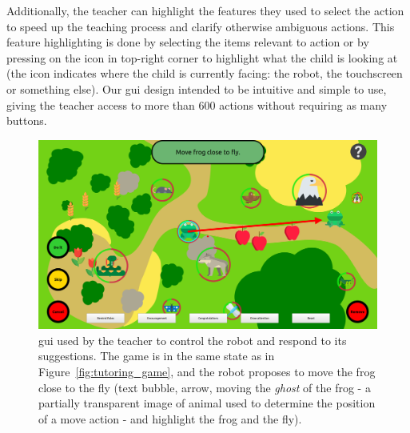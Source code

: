 Additionally, the teacher can highlight the features they used to select the action to speed up the teaching process and clarify otherwise ambiguous actions. This feature highlighting is done by selecting the items relevant to action or by pressing on the icon in top-right corner to highlight what the child is looking at (the icon indicates where the child is currently facing: the robot, the touchscreen or something else).
Our \gls{gui} design intended to be intuitive and simple to use, giving the teacher access to more than 600 actions without requiring as many buttons. %

\begin{figure}[ht]
	\centering
	\includegraphics[width=1\textwidth]{gui.png}
	\caption{\gls{gui} used by the teacher to control the robot and respond to its suggestions. The game is in the same state as in Figure~\ref{fig:tutoring_game}, and the robot proposes to move the frog close to the fly (text bubble, arrow, moving the \textit{ghost} of the frog - a partially transparent image of animal used to determine the position of a move action - and highlight the frog and the fly).}
	\label{fig:tutoring_gui}
\end{figure}

